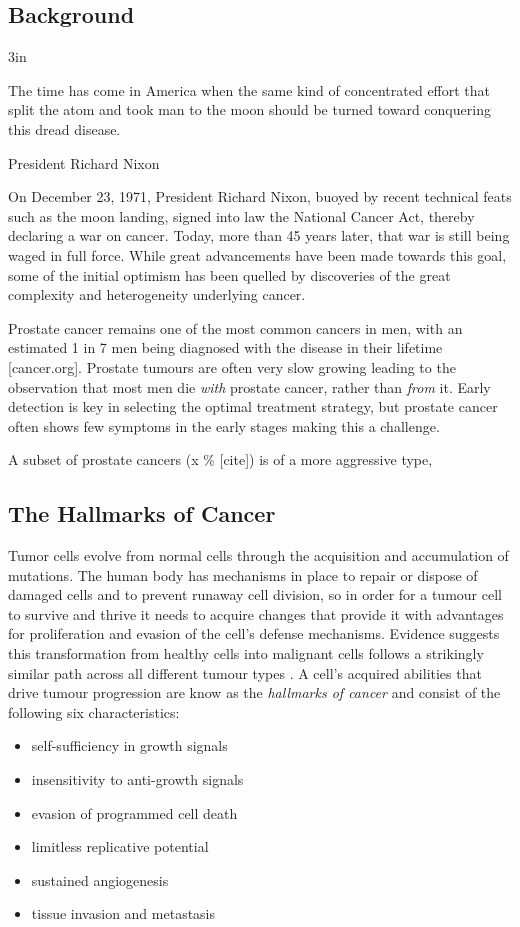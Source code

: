 \subsection{Background}
\epigraph{3in}{The time has come in America when the same kind of concentrated effort that split the atom and took man to the moon should be turned toward conquering this dread disease.}{President Richard Nixon}

On December 23, 1971, President Richard Nixon, buoyed by recent technical feats such as the moon landing, signed into law the National Cancer Act, thereby declaring a war on cancer. Today, more than 45 years later, that war is still being waged in full force. While great advancements have been made towards this goal, some of the initial optimism has been quelled by discoveries of the great complexity and heterogeneity underlying cancer.

Prostate cancer remains one of the most common cancers in men, with an estimated 1 in 7 men being diagnosed with the disease in their lifetime \cite{}[cancer.org]. Prostate tumours are often very slow growing leading to the observation that most men die \emph{with} prostate cancer, rather than \emph{from} it. Early detection is key in selecting the optimal treatment strategy, but prostate cancer often shows few symptoms in the early stages making this a challenge.

A subset of prostate cancers (x \% [cite]) is of a more aggressive type,


\subsection{The Hallmarks of Cancer}

Tumor cells evolve from normal cells through the acquisition and accumulation of mutations. The human body has mechanisms in place to repair or dispose of damaged cells and to prevent runaway cell division, so in order for a tumour cell to survive and thrive it needs to acquire changes that provide it with advantages for proliferation and evasion of the cell's defense mechanisms. Evidence suggests this transformation from healthy cells into malignant cells follows a strikingly similar path across all different tumour types \cite{}. A cell's acquired abilities that drive tumour progression are know as the \emph{hallmarks of cancer} and consist of the following six characteristics:

\begin{itemize}
    \item self-sufficiency in growth signals
    \item insensitivity to anti-growth signals
    \item evasion of programmed cell death
    \item limitless replicative potential
    \item sustained angiogenesis
    \item tissue invasion and metastasis
\end{itemize}

